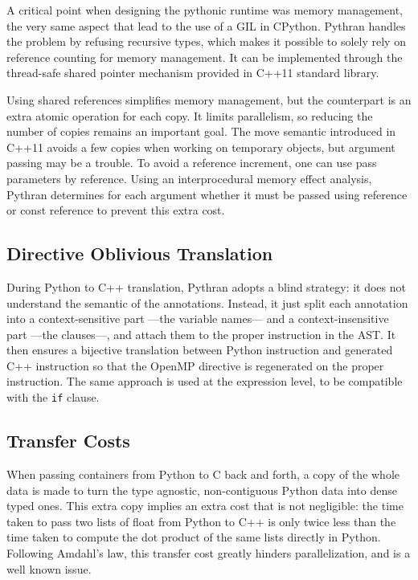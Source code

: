 \documentclass{llncs}
\begin{document}
A critical point when designing the pythonic runtime was memory management, the
very same aspect that lead to the use of a GIL in CPython. Pythran handles the
problem by refusing recursive types, which makes it possible to solely rely on
reference counting for memory management. It can be implemented through the
thread-safe shared pointer mechanism provided in C++11 standard library.

Using shared references simplifies memory management, but the counterpart is an
extra atomic operation for each copy. It limits parallelism, so reducing the
number of copies remains an important goal. The move semantic introduced in
C++11 avoids a few copies when working on temporary objects, but argument
passing may be a trouble. To avoid a reference increment, one can use pass
parameters by reference. Using an interprocedural memory effect analysis, Pythran
determines for each argument whether it must be passed using reference or const
reference to prevent this extra cost.

\subsection{Directive Oblivious Translation}

During Python to C++ translation, Pythran adopts a blind strategy: it does not
understand the semantic of the annotations. Instead, it just split each
annotation into a context-sensitive part ---the variable names--- and a
context-insensitive part ---the clauses---, and attach them to the proper
instruction in the AST. It then ensures a bijective translation between Python
instruction and generated C++ instruction so that the OpenMP directive is
regenerated on the proper instruction. The same approach is used at the
expression level, to be compatible with the \texttt{if} clause.

\subsection{Transfer Costs}

When passing containers from Python to C back and forth, a copy of the whole
data is made to turn the type agnostic, non-contiguous Python data into dense
typed ones. This extra copy implies an extra cost that is not negligible: the
time taken to pass two lists of float from Python to C++ is only twice less than
the time taken to compute the dot product of the same lists directly in Python.
Following Amdahl's law, this transfer cost greatly hinders parallelization, and
is a well known issue.
\end{document}
